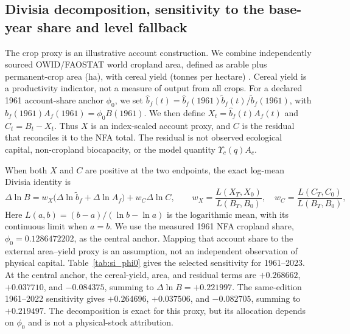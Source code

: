 \documentclass[11pt,a4paper]{article}
\newcommand{\Ups}{\Upsilon_c}
\begin{document}
\newpage
\subsection{Divisia decomposition, sensitivity to the base-year share and level fallback}\label{si:divisia}

The crop proxy is an illustrative account construction. We combine independently sourced OWID/FAOSTAT world cropland area, defined as arable plus permanent-crop area (ha), with cereal yield (tonnes per hectare) \citep{OWIDCropland2026,OWIDCereal2026}. Cereal yield is a productivity indicator, not a measure of output from all crops. For a declared 1961 account-share anchor $\phi_0$, we set $\hat b_f(t)=\hat b_f(1961)\tilde b_f(t)/\tilde b_f(1961)$, with $\hat b_f(1961)A_f(1961)=\phi_0B(1961)$. We then define $X_t=\hat b_f(t)A_f(t)$ and $C_t=B_t-X_t$. Thus $X$ is an index-scaled account proxy, and $C$ is the residual that reconciles it to the NFA total. The residual is not observed ecological capital, non-cropland biocapacity, or the model quantity $\Ups(q)A_c$.

When both $X$ and $C$ are positive at the two endpoints, the exact log-mean Divisia identity is
\begin{equation}
\Delta\ln B=w_X\bigl(\Delta\ln\tilde b_f+\Delta\ln A_f\bigr)+w_C\Delta\ln C,
\qquad w_X=\frac{L(X_T,X_0)}{L(B_T,B_0)},\quad w_C=\frac{L(C_T,C_0)}{L(B_T,B_0)},
\end{equation}
Here $L(a,b)=(b-a)/(\ln b-\ln a)$ is the logarithmic mean, with its continuous limit when $a=b$. We use the measured 1961 NFA cropland share, $\phi_0=0.1286472202$, as the central anchor. Mapping that account share to the external area--yield proxy is an assumption, not an independent observation of physical capital. Table~\ref{tab:si_phi0} gives the selected sensitivity for 1961--2023. At the central anchor, the cereal-yield, area, and residual terms are $+0.268662$, $+0.037710$, and $-0.084375$, summing to $\Delta\ln B=+0.221997$. The same-edition 1961--2022 sensitivity gives $+0.264696$, $+0.037506$, and $-0.082705$, summing to $+0.219497$. The decomposition is exact for this proxy, but its allocation depends on $\phi_0$ and is not a physical-stock attribution.
\end{document}
